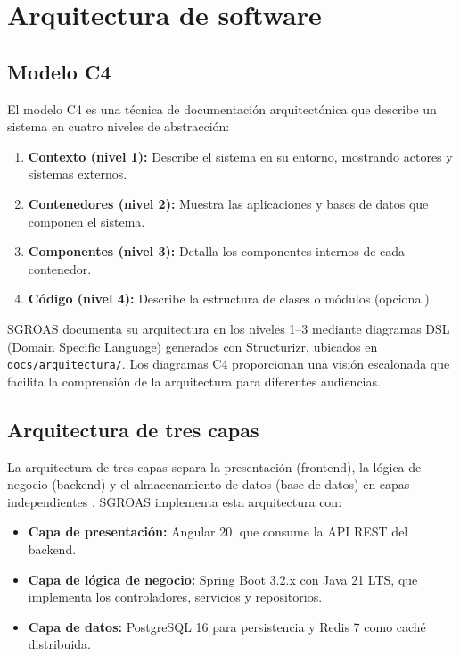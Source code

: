 \section{Arquitectura de software}
\label{sec:architecture-theory}

\subsection{Modelo C4}
\label{sec:c4}

El modelo C4 \cite{c4model} es una técnica de documentación arquitectónica que describe un sistema en cuatro niveles de abstracción:
\begin{enumerate}
  \item \textbf{Contexto (nivel 1):} Describe el sistema en su entorno, mostrando actores y sistemas externos.
  \item \textbf{Contenedores (nivel 2):} Muestra las aplicaciones y bases de datos que componen el sistema.
  \item \textbf{Componentes (nivel 3):} Detalla los componentes internos de cada contenedor.
  \item \textbf{Código (nivel 4):} Describe la estructura de clases o módulos (opcional).
\end{enumerate}

SGROAS documenta su arquitectura en los niveles 1--3 mediante diagramas DSL (Domain Specific Language) generados con Structurizr, ubicados en \texttt{docs/arquitectura/}. Los diagramas C4 proporcionan una visión escalonada que facilita la comprensión de la arquitectura para diferentes audiencias.

\subsection{Arquitectura de tres capas}
\label{sec:three-tier}

La arquitectura de tres capas separa la presentación (frontend), la lógica de negocio (backend) y el almacenamiento de datos (base de datos) en capas independientes \cite{martin2017}. SGROAS implementa esta arquitectura con:
\begin{itemize}
  \item \textbf{Capa de presentación:} Angular 20, que consume la API REST del backend.
  \item \textbf{Capa de lógica de negocio:} Spring Boot 3.2.x con Java 21 LTS, que implementa los controladores, servicios y repositorios.
  \item \textbf{Capa de datos:} PostgreSQL 16 para persistencia y Redis 7 como caché distribuida.
\end{itemize}

